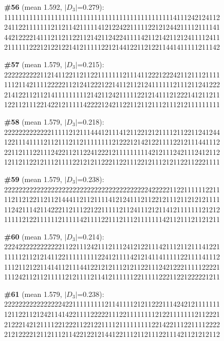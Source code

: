 \documentclass[10pt]{article}
\begin{document}
\noindent\textbf{\#56} (mean 1.592, $|D_3|$=0.279):\\
111111111111111111111111111111111111111111111114111242124112\\
241122111111121121142111114121224221111122121244211112111141\\
442122221411121121122112142112422411114211214211212411112411\\
211111122212122122141211111221214412211212211441411111211142\medskip

\noindent\textbf{\#57} (mean 1.579, $|D_3|$=0.215):\\
222222222211214112211211221111111211141122212224211211121111\\
111211421111222221121241222122141121121241111112111211241222\\
214122112112141111111112142112421111122121411121222141211211\\
122112111221422121111142222124211221121121112111212111111111\medskip

\noindent\textbf{\#58} (mean 1.579, $|D_3|$=0.218):\\
222222222222211111212111444121114121122121211112112211241244\\
122111411112112111211211111111212221214212211112212111441112\\
221121112211124221121122412221211111111142121112421112412112\\
121121122121112111122121211222112211122121112121122112221111\medskip

\noindent\textbf{\#59} (mean 1.579, $|D_3|$=0.238):\\
222222222222222222222222222222222222222242222211221111112211\\
112112122112112144411211211114121241112112212111211212121111\\
112421114211422211211122122111112112411121211412111111121212\\
111112122111111211111421111221112111211111114211211121121211\medskip

\noindent\textbf{\#60} (mean 1.579, $|D_3|$=0.214):\\
222422222222222211221112421112111241212211142111211211141221\\
111112112121411221111111112241211114212141141111122111141112\\
111211212211414112111441221212111212112211124212221111122221\\
111242112112111112121111211412111111221111122211221222221211\medskip

\noindent\textbf{\#61} (mean 1.579, $|D_3|$=0.238):\\
222222222222222242211111111121141111212112221114242121111111\\
121122112124211414221111222221112211111111212211111112112221\\
212221421211112212221122122111121111111112214221112211112222\\
212122221211211121142212212144122111211211122111421121212112\medskip
\end{document}
